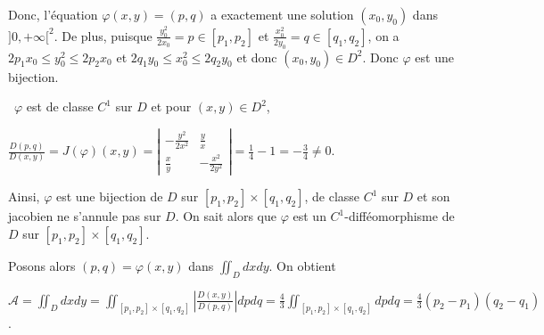 {{Donc, l'équation $\varphi(x,y)=(p,q)$ a exactement une solution $(x_0,y_0)$ dans $]0,+\infty[^2$. De plus, puisque $ \frac{y_0^2}{2x_0}=p\in[p_1,p_2]$ et $ \frac{x_0^2}{2y_0}=q\in[q_1,q_2]$, on a $2p_1x_0\leqslant y_0^2\leqslant 2p_2x_0$ et $2q_1y_0\leqslant x_0^2\leqslant 2q_2y_0$ et donc $(x_0,y_0)\in D^2$. Donc $\varphi$ est une bijection.

\textbullet~$\varphi$ est de classe $C^1$ sur $D$ et pour $(x,y)\in D^2$,

\begin{center}
$ \frac{D(p,q)}{D(x,y)}=J(\varphi)(x,y)=\left|
\begin{array}{cc}
- \frac{y^2}{2x^2}& \frac{y}{x}\\
 \frac{x}{y}&- \frac{x^2}{2y^2}
\end{array}
\right|= \frac{1}{4}-1=- \frac{3}{4}\neq0$.
\end{center}

Ainsi, $\varphi$ est une bijection de $D$ sur $[p_1,p_2]\times[q_1,q_2]$, de classe $C^1$ sur $D$ et son jacobien ne s'annule pas sur $D$. On sait alors que $\varphi$ est un $C^1$-difféomorphisme de $D$ sur $[p_1,p_2]\times[q_1,q_2]$.

Posons alors $(p,q)=\varphi(x,y)$ dans $\displaystyle\iint_{D}dxdy$. On obtient

\begin{center}
$\mathcal{A}=\displaystyle\iint_{D}dxdy=\displaystyle\iint_{[p_1,p_2]\times[q_1,q_2]}\left| \frac{D(x,y)}{D(p,q)}\right|dpdq=\displaystyle \frac{4}{3}\iint_{[p_1,p_2]\times[q_1,q_2]}dpdq= \frac{4}{3}(p_2-p_1)(q_2-q_1)$.
\end{center}

\begin{center}
\end{center}
}
}
